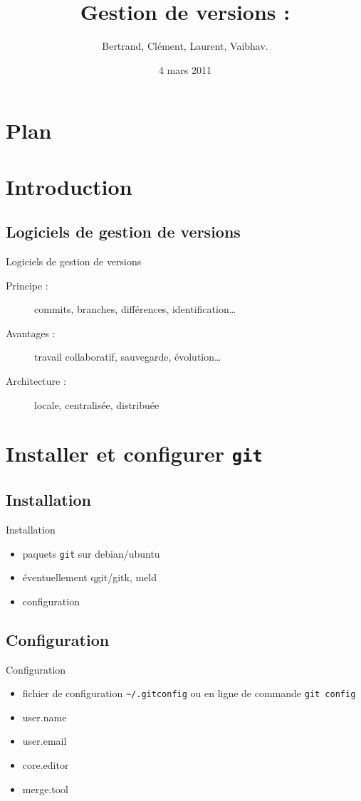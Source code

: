 \documentclass{beamer}
\title[ROSE]{Gestion de versions : \git}
\author{Bertrand, Clément, Laurent, Vaibhav.}
\institute{Télécom ParisTech}
\date{4 mars 2011}
\newcommand{\git}{\texttt{git}\xspace}
\begin{document}
\begin{frame}
  \titlepage
\end{frame}

\section*{Plan}

\section{Introduction}

\subsection*{Logiciels de gestion de versions}
\begin{frame}{Logiciels de gestion de versions}
  \begin{description}
  \item[Principe :] commits, branches, différences, identification\dots
  \item[Avantages :] travail collaboratif, sauvegarde, évolution\dots
  \item[Architecture :] locale, centralisée, distribuée
  \end{description}
\end{frame}

\section{Installer et configurer \git}

\subsection*{Installation}
\begin{frame}{Installation}
  \begin{itemize}
  \item paquets \git sur debian/ubuntu
  \item éventuellement qgit/gitk, meld
  \item configuration
  \end{itemize}
\end{frame}

\subsection*{Configuration}
\begin{frame}[containsverbatim]{Configuration}
  \begin{itemize}
  \item fichier de configuration \lstinline|~/.gitconfig| ou en ligne de commande \lstinline|git config|
  \item user.name
  \item user.email
  \item core.editor
  \item merge.tool
  \end{itemize}
\end{frame}
\end{document}

